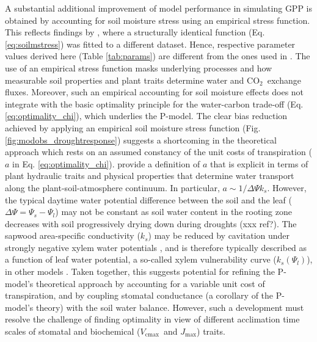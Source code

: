 \documentclass{myreport}
\newcommand{\coo}{CO$_2$}
\newcommand{\vcmax}{$V_{\text{cmax}}$}
\newcommand{\jmax}{$J_{\text{max}}$}
\begin{document}
A substantial additional improvement of model performance in simulating GPP is obtained by accounting for soil moisture stress using an empirical stress function. This reflects findings by \cite{stocker19natgeo}, where a structurally identical function (Eq. \ref{eq:soilmstress}) was fitted to a different dataset. Hence, respective parameter values derived here (Table \ref{tab:params}) are different from the ones used in \cite{stocker19natgeo}. The use of an empirical stress function masks underlying processes and how measurable soil properties and plant traits determine water and \coo\ exchange fluxes. Moreover, such an empirical accounting for soil moisture effects does not integrate with the basic optimality principle for the water-carbon trade-off (Eq. \ref{eq:optimality_chi}), which underlies the P-model. The clear bias reduction achieved by applying an empirical soil moisture stress function (Fig. \ref{fig:modobs_droughtresponse}) suggests a shortcoming in the theoretical approach which rests on an assumed constancy of the unit costs of transpiration ($a$ in Eq. \ref{eq:optimality_chi}). \cite{prentice14ecollett} provide a definition of $a$ that is explicit in terms of plant hydraulic traits and physical properties that determine water transport along the plant-soil-atmosphere continuum. In particular, $a \sim 1 / \Delta \Psi k_s$. However, the typical daytime water potential difference between the soil and the leaf ($\Delta \Psi = \Psi_s - \Psi_l$) may not be constant as soil water content in the rooting zone decreases with soil progressively drying down during droughts (xxx ref?). The sapwood area-specific conductivity ($k_s$) may be reduced by cavitation under strongly negative xylem water potentials \citep{sperry15}, and is therefore typically described as a function of leaf water potential, a so-called xylem vulnerability curve ($k_s(\Psi_l)$), in other models \citep{mencuccini19newphyt}. Taken together, this suggests potential for refining the P-model's theoretical approach by accounting for a variable unit cost of transpiration, and by coupling stomatal conductance (a corollary of the P-model's theory) with the soil water balance. However, such a development must resolve the challenge of finding optimality in view of different acclimation time scales of stomatal and biochemical (\vcmax\ and \jmax ) traits.
\end{document}
